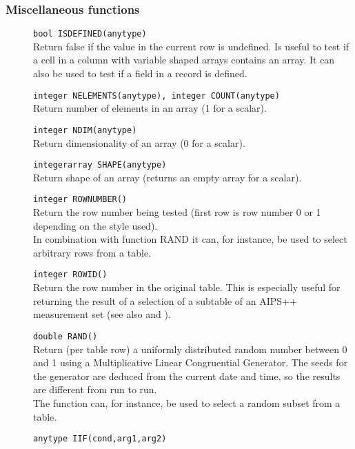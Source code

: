 \subsubsection{Miscellaneous functions}
\begin{description}
  \item[] \texttt{bool ISDEFINED(anytype)}\\
    Return false if the value in the current row is undefined. Is
    useful to test if a cell in a column with variable shaped arrays
    contains an array. It can also be used to test if a field in a
    record is defined.
  \item[] \texttt{integer NELEMENTS(anytype), integer COUNT(anytype)}\\
    Return number of elements in an array (1 for a scalar).
  \item[] \texttt{integer NDIM(anytype)}\\
    Return dimensionality of an array (0 for a scalar).
  \item[] \texttt{integerarray SHAPE(anytype)}\\
    Return shape of an array (returns an empty array for a scalar).
  \item[] \texttt{integer ROWNUMBER()}\\
    Return the row number being tested (first row is row number 0 or 1
    depending on the style used).
    \\In combination with function RAND it can, for instance,
    be used to select arbitrary rows from a table.
  \item[] \texttt{integer ROWID()}\\
    Return the row number in the original table. This is especially
    useful for returning the result of a selection of a subtable
    of an AIPS++ measurement set
    (see also 
    and ).
  \item[] \texttt{double RAND()}\\
    Return (per table row) a uniformly distributed random number
    between 0 and 1 using a Multiplicative Linear Congruential Generator.
    The seeds for the generator are deduced from the current date and
    time, so the results are different from run to run.
    \\The function can, for instance, be used to select a random
    subset from a table.
  \item[] \texttt{anytype IIF(cond,arg1,arg2)}\\

\end{description}

